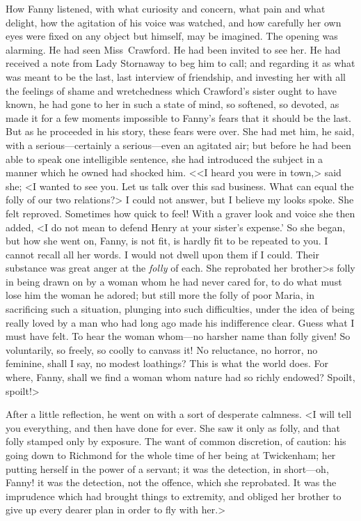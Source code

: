 How Fanny listened, with what curiosity and concern, what pain and what delight, how the agitation of his voice was watched, and how carefully her own eyes were fixed on any object but himself, may be imagined. The opening was alarming. He had seen Miss~Crawford. He had been invited to see her. He had received a note from Lady Stornaway to beg him to call; and regarding it as what was meant to be the last, last interview of friendship, and investing her with all the feelings of shame and wretchedness which Crawford's sister ought to have known, he had gone to her in such a state of mind, so softened, so devoted, as made it for a few moments impossible to Fanny's fears that it should be the last. But as he proceeded in his story, these fears were over. She had met him, he said, with a serious—certainly a serious—even an agitated air; but before he had been able to speak one intelligible sentence, she had introduced the subject in a manner which he owned had shocked him. <<I heard you were in town,> said she; <I wanted to see you. Let us talk over this sad business. What can equal the folly of our two relations?> I could not answer, but I believe my looks spoke. She felt reproved. Sometimes how quick to feel! With a graver look and voice she then added, <I do not mean to defend Henry at your sister's expense.' So she began, but how she went on, Fanny, is not fit, is hardly fit to be repeated to you. I cannot recall all her words. I would not dwell upon them if I could. Their substance was great anger at the \textit{folly}  of each. She reprobated her brother>s folly in being drawn on by a woman whom he had never cared for, to do what must lose him the woman he adored; but still more the folly of poor Maria, in sacrificing such a situation, plunging into such difficulties, under the idea of being really loved by a man who had long ago made his indifference clear. Guess what I must have felt. To hear the woman whom—no harsher name than folly given! So voluntarily, so freely, so coolly to canvass it! No reluctance, no horror, no feminine, shall I say, no modest loathings? This is what the world does. For where, Fanny, shall we find a woman whom nature had so richly endowed? Spoilt, spoilt!>

After a little reflection, he went on with a sort of desperate calmness. <I will tell you everything, and then have done for ever. She saw it only as folly, and that folly stamped only by exposure. The want of common discretion, of caution: his going down to Richmond for the whole time of her being at Twickenham; her putting herself in the power of a servant; it was the detection, in short—oh, Fanny! it was the detection, not the offence, which she reprobated. It was the imprudence which had brought things to extremity, and obliged her brother to give up every dearer plan in order to fly with her.>

